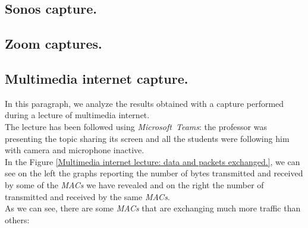 
\subsection{Sonos capture.}

\subsection{Zoom captures.}

\subsection{Multimedia internet capture.}
In this paragraph, we analyze the results obtained with a capture performed during a lecture of
multimedia internet. \\ 
The lecture has been followed using \textit{Microsoft\ Teams}: the professor was presenting the
topic sharing its screen and all the students were following him with camera and microphone inactive.\\
In the Figure \ref{Multimedia internet lecture: data and packets exchanged.}, we can see on the
left the graphs reporting the number of bytes transmitted and received by some of the \textit{MACs}
we have revealed and on the right the number of transmitted and received by the same \textit{MACs}.\\
As we can see, there are some \textit{MACs} that are exchanging much more traffic than others:

